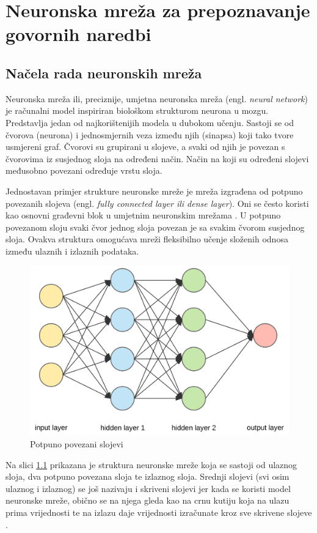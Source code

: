 \chapter{Neuronska mreža za prepoznavanje govornih naredbi}
\label{pog:neuronska_mreza}

\section{Načela rada neuronskih mreža}

Neuronska mreža ili, preciznije, umjetna neuronska mreža (engl. \textit{neural network}) je 
računalni model inspiriran
biološkom strukturom neurona u mozgu. Predstavlja jedan od najkorištenijih modela 
u dubokom učenju. Sastoji se od čvorova (neurona) i jednosmjernih
veza između njih (sinapsa) koji tako tvore usmjereni graf. Čvorovi su grupirani u slojeve,
a svaki od njih je povezan s čvorovima iz susjednog sloja na određeni način. Način na koji su
određeni slojevi međusobno povezani određuje vrstu sloja. 

Jednostavan primjer strukture neuronske mreže je mreža izgrađena od potpuno povezanih slojeva 
(engl. \textit{fully connected layer ili dense layer}). Oni se često koristi kao osnovni građevni blok u 
umjetnim neuronskim mrežama \cite{dense}.
U potpuno povezanom sloju svaki čvor jednog sloja povezan je sa svakim čvorom susjednog sloja.
Ovakva struktura omogućava mreži fleksibilno učenje složenih odnosa između ulaznih i izlaznih podataka.

\begin{figure}[htb]
  \centering
  \includegraphics[width=0.5\linewidth]{Chapters/neuronska_mreza/dense_layer.png} 
  \caption{Potpuno povezani slojevi \cite{dense}}
  \label{pic:dense_layer}
\end{figure}

Na slici \ref{pic:dense_layer} prikazana je struktura neuronske mreže koja se sastoji od ulaznog sloja,
dva potpuno povezana sloja te izlaznog sloja. Srednji slojevi (svi osim ulaznog i izlaznog)
se još nazivaju i skriveni slojevi jer kada se koristi model neuronske mreže, obično se
na njega gleda kao na crnu kutiju koja na ulazu prima vrijednosti te na izlazu daje vrijednosti
izračunate kroz sve skrivene slojeve \cite{fully_connected}.

